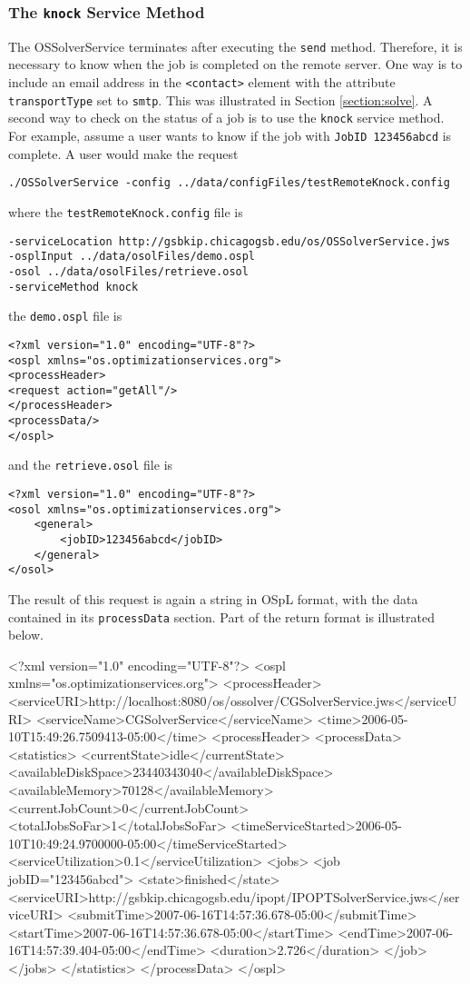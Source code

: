\documentclass[11pt]{article}
\renewcommand{\_}{{\char"5F}}
\renewcommand{\{}{{\char"7B}}
\renewcommand{\}}{{\char"7D}}
\renewcommand{\^}{{\char"0D}}
\renewcommand{\'}{{\char"0D}}
\begin{document}
\subsubsection{The  {\tt knock} Service Method}\label{section:knock}

The OSSolverService terminates after executing the {\tt send} method. Therefore, it is necessary to know when the job is completed on the remote server. One way is to include an email address in the  {\tt <contact>}  element with the attribute {\tt transportType}     set to {\tt smtp}.  This was illustrated in Section \ref{section:solve}.  A second way to check on the status of a job is to use the {\tt knock} service method.  For example, assume a user   wants to know if  the job with {\tt JobID 123456abcd}  is complete. A user would make the request
\begin{verbatim}
./OSSolverService -config ../data/configFiles/testRemoteKnock.config
\end{verbatim}
where the {\tt testRemoteKnock.config} file is
\begin{verbatim}
-serviceLocation http://gsbkip.chicagogsb.edu/os/OSSolverService.jws
-osplInput ../data/osolFiles/demo.ospl
-osol ../data/osolFiles/retrieve.osol
-serviceMethod knock
\end{verbatim}
the {\tt demo.ospl} file is
\begin{verbatim}
<?xml version="1.0" encoding="UTF-8"?>
<ospl xmlns="os.optimizationservices.org">
<processHeader>
<request action="getAll"/>
</processHeader>
<processData/>
</ospl>
\end{verbatim}
and the {\tt retrieve.osol} file is
\begin{verbatim}
<?xml version="1.0" encoding="UTF-8"?>
<osol xmlns="os.optimizationservices.org">
 	<general>
 		<jobID>123456abcd</jobID>
	</general>
</osol>
\end{verbatim}
The result of this request is again a string in OSpL format, with the data contained in its {\tt processData} section.  Part of the return format is illustrated below.
\begin{verbatimtab}[4]
<?xml version="1.0" encoding="UTF-8"?>
<ospl xmlns="os.optimizationservices.org">
  <processHeader>
    <serviceURI>http://localhost:8080/os/ossolver/CGSolverService.jws</serviceURI>
    <serviceName>CGSolverService</serviceName>
    <time>2006-05-10T15:49:26.7509413-05:00</time>
  <processHeader>
  <processData>
     <statistics>
        <currentState>idle</currentState>
        <availableDiskSpace>23440343040</availableDiskSpace>
        <availableMemory>70128</availableMemory>
        <currentJobCount>0</currentJobCount>
        <totalJobsSoFar>1</totalJobsSoFar>
        <timeServiceStarted>2006-05-10T10:49:24.9700000-05:00</timeServiceStarted>
        <serviceUtilization>0.1</serviceUtilization>
        <jobs>
    	  <job jobID="123456abcd">
    		<state>finished</state>
    		<serviceURI>http://gsbkip.chicagogsb.edu/ipopt/IPOPTSolverService.jws</serviceURI>
    		<submitTime>2007-06-16T14:57:36.678-05:00</submitTime>
    		<startTime>2007-06-16T14:57:36.678-05:00</startTime>
    		<endTime>2007-06-16T14:57:39.404-05:00</endTime>
    		<duration>2.726</duration>
          </job>
        </jobs>
     </statistics>
  </processData>
</ospl>
\end{verbatimtab}
\end{document}
